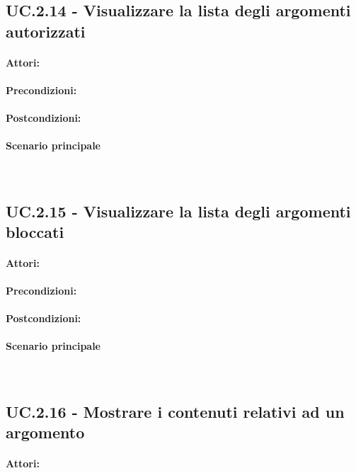 \documentclass[10pt,a4paper,headinclude,footinclude,hidelinks]{scrreprt} %
\begin{document}
	\subsection[UC.2.14]{UC.2.14 - Visualizzare la lista degli argomenti autorizzati}
	\label{ch:stage:ar:uc:2_14}
	\paragraph{Attori:}
	\paragraph{Precondizioni:}
	\paragraph{Postcondizioni:}
	\paragraph{Scenario principale} \hfill \\

	\subsection[UC.2.15]{UC.2.15 - Visualizzare la lista degli argomenti bloccati}
	\label{ch:stage:ar:uc:2_15}
	\paragraph{Attori:}
	\paragraph{Precondizioni:}
	\paragraph{Postcondizioni:}
	\paragraph{Scenario principale} \hfill \\

	\subsection[UC.2.16]{UC.2.16 - Mostrare i contenuti relativi ad un argomento}
	\label{ch:stage:ar:uc:2_16}
	\paragraph{Attori:}
\end{document}
